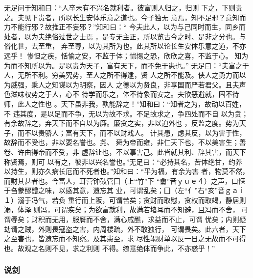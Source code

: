 \documentclass[]{article}
\begin{document}
无足问于知和曰：``人卒未有不兴名就利者。彼富则人归之，归则
下之，下则贵之。夫见下贵者，所以长生安体乐意之道也。今子独无
意焉，知不足邪？意知而力不能行邪？故推正不妄邪？''知和曰：``
今夫此人，以为与己同时而生，同乡而处者，以为夫绝俗过世之士焉
，是专无主正，所以览古今之时、是非之分也。与俗化世，去至重，
弃至尊，以为其所为也。此其所以论长生安体乐意之道，不亦远乎！
惨怛之疾，恬愉之安，不监于体；怵惕之恐，欣欣之喜，不监于心。
知为为而不知所以为。是以贵为天子，富有天下，而不免于患也。''
无足曰：``夫富之于人，无所不利。穷美究势，至人之所不得逮，贤
人之所不能及。侠人之勇力而以为威强，秉人之知谋以为明察，因人
之德以为贤良，非享国而严若君父。且夫声色滋味权势之于人，心不
待学而乐之，体不待象而安之。夫欲恶避就，固不待师，此人之性也
。天下虽非我，孰能辞之！''知和曰：``知者之为，故动以百姓，不
违其度，是以足而不争，无以为故不求。不足故求之，争四处而不自
以为贪；有余故辞之，弃天下而不自以为廉。廉贪之实，非以迫外也
，反监之度。势为天子，而不以贵骄人；富有天下，而不以财戏人。
计其患，虑其反，以为害于性，故辞而不受也，非以要名誉也。尧、
舜为帝而雍，非仁天下也，不以美害生；善卷、许由得帝而不受，非
虚辞让也，不以事害己。此皆就其利、辞其害，而天下称贤焉，则可
以有之，彼非以兴名誉也。''无足曰：``必持其名，苦体绝甘，约养
以持生，则亦久病长厄而不死者也。''知和曰：``平为福，有余为害
者，物莫不然，而财其甚者也。今富人，耳营钟鼓管囗（上``竹''下
``龠''音ｙｕｅ４）之声，口惬于刍豢醪醴之味，以感其意，遗忘其
业，可谓乱矣；囗（左``亻''右``亥''音ｇａｉ１）溺于冯气，若负
重行而上阪，可谓苦矣；贪财而取慰，贪权而取竭，静居则溺，体泽
则冯，可谓疾矣；为欲富就利，故满若堵耳而不知避，且冯而不舍，
可谓辱矣；财积而无用，服膺而不舍，满心戚醮，求益而不止，可谓
忧矣；内则疑劫请之贼，外则畏寇盗之害，内周楼疏，外不敢独行，
可谓畏矣。此六者，天下之至害也，皆遗忘而不知察。及其患至，求
尽性竭财单以反一日之无故而不可得也。故观之名则不见，求之利则
不得。缭意绝体而争此，不亦惑乎！''

\hypertarget{header-n983}{%
\subsubsection{说剑}\label{header-n983}}
\end{document}
